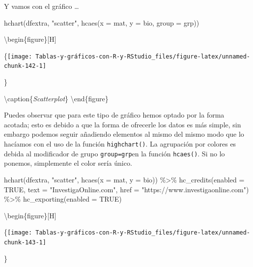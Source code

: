 \documentclass[
]{book}
\newenvironment{Shaded}{\begin{snugshade}}{\end{snugshade}}
\newcommand{\AttributeTok}[1]{\textcolor[rgb]{0.77,0.63,0.00}{#1}}
\newcommand{\ConstantTok}[1]{\textcolor[rgb]{0.00,0.00,0.00}{#1}}
\newcommand{\FunctionTok}[1]{\textcolor[rgb]{0.00,0.00,0.00}{#1}}
\newcommand{\NormalTok}[1]{#1}
\newcommand{\SpecialCharTok}[1]{\textcolor[rgb]{0.00,0.00,0.00}{#1}}
\newcommand{\StringTok}[1]{\textcolor[rgb]{0.31,0.60,0.02}{#1}}
\begin{document}
Y vamos con el gráfico \ldots{}

\begin{Shaded}
\begin{Highlighting}[]
\FunctionTok{hchart}\NormalTok{(dfextra, }\StringTok{"scatter"}\NormalTok{, }\FunctionTok{hcaes}\NormalTok{(}\AttributeTok{x =}\NormalTok{ mat, }\AttributeTok{y =}\NormalTok{ bio, }\AttributeTok{group =}\NormalTok{ grp))}
\end{Highlighting}
\end{Shaded}

\textbackslash begin\{figure\}{[}H{]}

\{\centering \texttt{[image: Tablas-y-gráficos-con-R-y-RStudio\_files/figure-latex/unnamed-chunk-142-1]}

\}

\textbackslash caption\{\emph{Scatterplot}\}\label{fig:unnamed-chunk-142}
\textbackslash end\{figure\}

Puedes observar que para este tipo de gráfico hemos optado por la forma acotada; esto es debido a que la forma de ofrecerle los datos es más simple, sin embargo podemos seguir añadiendo elementos al mismo del mismo modo que lo hacíamos con el uso de la función \texttt{highchart()}. La agrupación por colores es debida al modificador de grupo \texttt{group=grp}en la función \texttt{hcaes()}. Si no lo ponemos, simplemente el color sería único.

\begin{Shaded}
\begin{Highlighting}[]
\FunctionTok{hchart}\NormalTok{(dfextra, }\StringTok{"scatter"}\NormalTok{, }\FunctionTok{hcaes}\NormalTok{(}\AttributeTok{x =}\NormalTok{ mat, }\AttributeTok{y =}\NormalTok{ bio)) }\SpecialCharTok{\%\textgreater{}\%} \FunctionTok{hc\_credits}\NormalTok{(}\AttributeTok{enabled =} \ConstantTok{TRUE}\NormalTok{, }
  \AttributeTok{text =} \StringTok{"InvestigaOnline.com"}\NormalTok{, }\AttributeTok{href =} \StringTok{"https://www.investigaonline.com"}\NormalTok{) }\SpecialCharTok{\%\textgreater{}\%} 
  \FunctionTok{hc\_exporting}\NormalTok{(}\AttributeTok{enabled =} \ConstantTok{TRUE}\NormalTok{)}
\end{Highlighting}
\end{Shaded}

\textbackslash begin\{figure\}{[}H{]}

\{\centering \texttt{[image: Tablas-y-gráficos-con-R-y-RStudio\_files/figure-latex/unnamed-chunk-143-1]}

\}
\end{document}
